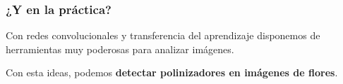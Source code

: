 \begin{frame}
    \frametitle{¿Y en la práctica?}

    \begin{block}{}
        \centering
        Con redes convolucionales y transferencia del aprendizaje disponemos
        de herramientas muy poderosas para analizar imágenes.
    \end{block}

    \pause
    \vspace{0.4cm}
    \begin{alertblock}{}
        \centering
        Con esta ideas, podemos \textbf{detectar polinizadores en imágenes de flores}.
    \end{alertblock}

\end{frame}
